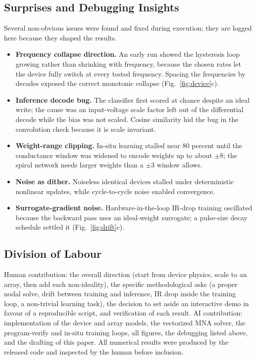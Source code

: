 \subsection{Surprises and Debugging Insights}
Several non-obvious issues were found and fixed during execution; they are logged
here because they shaped the results.
\begin{itemize}
\item \textbf{Frequency collapse direction.} An early run showed the hysteresis
loop growing rather than shrinking with frequency, because the chosen rates let
the device fully switch at every tested frequency. Spacing the frequencies by
decades exposed the correct monotonic collapse (Fig.~\ref{fig:device}c).
\item \textbf{Inference decode bug.} The classifier first scored at chance
despite an ideal write; the cause was an input-voltage scale factor left out of
the differential decode while the bias was not scaled. Cosine similarity hid the
bug in the convolution check because it is scale invariant.
\item \textbf{Weight-range clipping.} In-situ learning stalled near 80 percent
until the conductance window was widened to encode weights up to about $\pm 8$;
the spiral network needs larger weights than a $\pm 3$ window allows.
\item \textbf{Noise as dither.} Noiseless identical devices stalled under
deterministic nonlinear updates, while cycle-to-cycle noise enabled convergence.
\item \textbf{Surrogate-gradient noise.} Hardware-in-the-loop IR-drop training
oscillated because the backward pass uses an ideal-weight surrogate; a pulse-size
decay schedule settled it (Fig.~\ref{fig:drift}c).
\end{itemize}

\subsection{Division of Labour}
Human contribution: the overall direction (start from device physics, scale to an
array, then add each non-ideality), the specific methodological asks (a proper
nodal solve, drift between training and inference, IR drop inside the training
loop, a non-trivial learning task), the decision to set aside an interactive
demo in favour of a reproducible script, and verification of each result. AI
contribution: implementation of the device and array models, the vectorized MNA
solver, the program-verify and in-situ training loops, all figures, the debugging
listed above, and the drafting of this paper. All numerical results were produced
by the released code and inspected by the human before inclusion.

